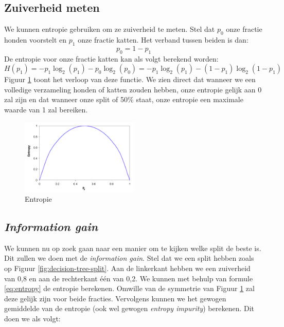 \subsection{Zuiverheid meten}

We kunnen entropie gebruiken om ze zuiverheid te meten. Stel dat $p_{0}$ onze fractie honden voorstelt en $p_{1}$ onze fractie katten. Het verband tussen beiden is dan:
\begin{equation}
	p_{0} = 1 - p_{1}
\end{equation}
\noindent
De entropie voor onze fractie katten kan als volgt berekend worden:
\begin{equation}
	H(p_{1}) = - p_{1} \log_{2} (p_{1}) - p_{0} \log_{2} (p_{0})
	= - p_{1} \log_{2} (p_{1}) - ( 1 - p_{1}) \log_{2} ( 1 - p_{1})
	\label{eq:entropy}
\end{equation}
\noindent
Figuur \ref{fig:entropy} toont het verloop van deze functie. We zien direct dat wanneer we een volledige verzameling honden of katten zouden hebben, onze entropie gelijk aan 0 zal zijn en dat wanneer onze split of 50$\%$ staat, onze entropie een maximale waarde van 1 zal bereiken.

\begin{figure}[h]
	\centering
	\includegraphics[width=0.5\textwidth]{images/30-entropy.png}
	\caption{Entropie}
	\label{fig:entropy}
\end{figure}

\subsection{\textit{Information gain}}

We kunnen nu op zoek gaan naar een manier om te kijken welke split de beste is. Dit zullen we doen met de \textit{information gain}. Stel dat we een split hebben zoals op Figuur \ref{fig:decision-tree-split}. Aan de linkerkant hebben we een zuiverheid van 0,8 en aan de rechterkant één van 0,2. We kunnen met behulp van formule \ref{eq:entropy} de entropie berekenen. Omwille van de symmetrie van Figuur \ref{fig:entropy} zal deze gelijk zijn voor beide fracties. Vervolgens kunnen we het gewogen gemiddelde van de entropie (ook wel gewogen \textit{entropy impurity}) berekenen. Dit doen we als volgt:

